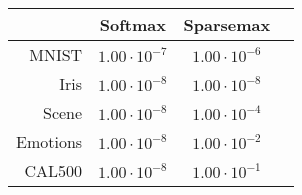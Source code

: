 \begin{tabular}{r|ccc}
& Softmax & Sparsemax \\
\hline
MNIST & $1.00 \cdot 10^{-7}$ & $1.00 \cdot 10^{-6}$ \\
Iris & $1.00 \cdot 10^{-8}$ & $1.00 \cdot 10^{-8}$ \\
Scene & $1.00 \cdot 10^{-8}$ & $1.00 \cdot 10^{-4}$ \\
Emotions & $1.00 \cdot 10^{-8}$ & $1.00 \cdot 10^{-2}$ \\
CAL500 & $1.00 \cdot 10^{-8}$ & $1.00 \cdot 10^{-1}$ \\
\end{tabular}
